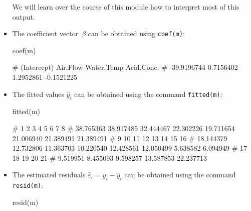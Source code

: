 \documentclass[
  a4paper,
]{article}
\newenvironment{Shaded}{\begin{snugshade}}{\end{snugshade}}
\newcommand{\FunctionTok}[1]{\textcolor[rgb]{0.00,0.00,0.00}{#1}}
\newcommand{\NormalTok}[1]{#1}
\theoremstyle{definition}
\theoremstyle{definition}
\theoremstyle{definition}
\theoremstyle{definition}
\theoremstyle{remark}
\begin{document}
\begin{itemize}
  We will learn over the course of this module how to interpret
  most of this output.
\item
  The coefficient vector~\(\beta\) can be obtained using
  \texttt{coef(m)}:

\begin{Shaded}
\begin{Highlighting}[]
  \FunctionTok{coef}\NormalTok{(m)}
\end{Highlighting}
\end{Shaded}

\begin{Shaded}
\begin{Highlighting}[]
\NormalTok{\# (Intercept)    Air.Flow  Water.Temp  Acid.Conc. }
\NormalTok{\# {-}39.9196744   0.7156402   1.2952861  {-}0.1521225}
\end{Highlighting}
\end{Shaded}
\item
  The fitted values \(\hat y_i\) can be obtained using
  the command \texttt{fitted(m)}:

\begin{Shaded}
\begin{Highlighting}[]
  \FunctionTok{fitted}\NormalTok{(m)}
\end{Highlighting}
\end{Shaded}

\begin{Shaded}
\begin{Highlighting}[]
\NormalTok{\#         1         2         3         4         5         6         7         8 }
\NormalTok{\# 38.765363 38.917485 32.444467 22.302226 19.711654 21.006940 21.389491 21.389491 }
\NormalTok{\#         9        10        11        12        13        14        15        16 }
\NormalTok{\# 18.144379 12.732806 11.363703 10.220540 12.428561 12.050499  5.638582  6.094949 }
\NormalTok{\#        17        18        19        20        21 }
\NormalTok{\#  9.519951  8.455093  9.598257 13.587853 22.237713}
\end{Highlighting}
\end{Shaded}
\item
  The estimated residuals \(\hat\varepsilon_i = y_i - \hat y_i\) can
  be obtained using the command \texttt{resid(m)}:

\begin{Shaded}
\begin{Highlighting}[]
  \FunctionTok{resid}\NormalTok{(m)}
\end{Highlighting}
\end{Shaded}


\end{itemize}
\end{document}
